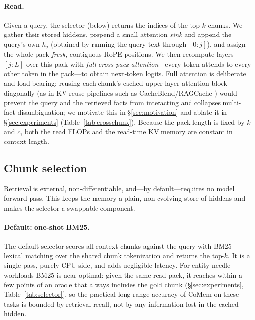 \paragraph{Read.} Given a query, the selector (below) returns the indices of the
top-$k$ chunks. We gather their stored hiddens, prepend a small attention
\emph{sink} and append the query's own $h_j$ (obtained by running the query text
through $[0{:}j]$), and assign the whole pack \emph{fresh}, contiguous RoPE
positions. We then recompute layers $[j{:}L]$ over this pack with
\emph{full cross-pack attention}---every token attends to every other token in
the pack---to obtain next-token logits. Full attention is deliberate and
load-bearing: reusing each chunk's cached upper-layer attention block-diagonally
(as in KV-reuse pipelines such as CacheBlend/RAGCache \citep{cacheblend,ragcache})
would prevent the query and the retrieved facts from interacting and collapses
multi-fact disambiguation; we motivate this in \S\ref{sec:motivation} and ablate
it in \S\ref{sec:experiments} (Table~\ref{tab:crosschunk}). Because the pack
length is fixed by $k$ and $c$, both the read FLOPs and the read-time KV memory
are constant in context length.

\subsection{Chunk selection}
\label{subsec:selector}
Retrieval is external, non-differentiable, and---by default---requires no model
forward pass. This keeps the memory a plain, non-evolving store of hiddens and
makes the selector a swappable component.

\paragraph{Default: one-shot BM25.} The default selector scores all context
chunks against the query with BM25 lexical matching over the shared chunk
tokenization and returns the top-$k$. It is a single pass, purely CPU-side, and
adds negligible latency. For entity-needle workloads BM25 is near-optimal:
given the same read pack, it reaches within a few points of an oracle that
always includes the gold chunk (\S\ref{sec:experiments},
Table~\ref{tab:selector}), so the practical long-range accuracy of CoMem on
these tasks is bounded by retrieval recall, not by any information lost in the
cached hidden.


